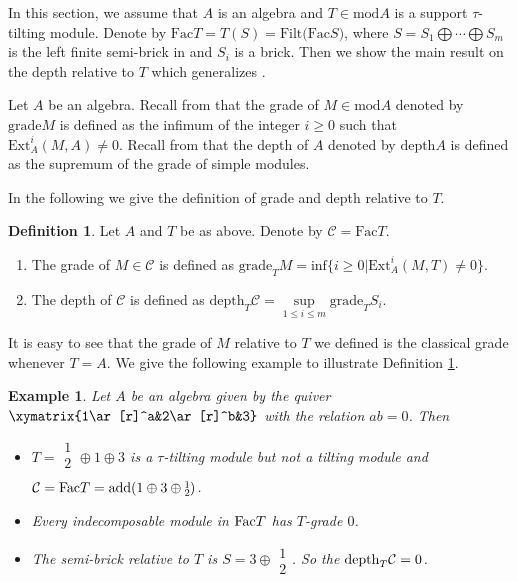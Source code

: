 \documentclass[a4paper]{amsart}
\newtheorem{exm}[thm]{Example}
\theoremstyle{definition}
\newtheorem{defn}[thm]{Definition}
\theoremstyle{remark}
\numberwithin{equation}{section}
\begin{document}
In this section, we assume that $A$ is an algebra and $T\in \text{mod} A$ is a support $\tau$-tilting module. Denote by $\text{Fac}T=T(S)=\text{Filt(Fac} S)$, where $S=S_1\bigoplus \cdots \bigoplus S_m$ is the left finite semi-brick in \cite[Theorem 2.3(2)]{As}
 and $S_i$ is a brick. Then we show the main result on the depth relative to $T$ which generalizes \cite[Proposition 1.3]{G}.


Let $A$ be an algebra. Recall from \cite{AuB} that the grade of $M\in \text{mod}A$ denoted by $\text{grade}M$ is defined as the infimum of the integer $i\geq 0$ such that $\text{Ext}^i_A(M,A)\neq 0$. Recall from \cite{G} that the depth of $A$ denoted by $\text{depth}A$ is defined as the supremum of the grade of simple modules.

In the following we give the definition of grade and depth relative to $T$.

\begin{defn}\label{3.1} Let $A$ and $T$ be as above. Denote by $\mathcal{C}=\text{Fac}T$.
\begin{enumerate}
\item The grade of $M\in \mathcal{C}$ is defined as
$\text{grade}_T M =\text{inf}\{i\geq 0 |\text{Ext}^i_A(M,T)\neq 0\}.$
\item The depth of $\mathcal{C}$ is defined as $\text{depth}_T \mathcal{C}={\sup\limits_{1\leq i\leq m}} \text{grade}_T S_i$.
\end{enumerate}
\end{defn}
 It is easy to see that the grade of $M$ relative to $T$ we defined is the classical grade whenever $T=A$.
We give the following example to illustrate Definition \ref{3.1}.

\begin{exm}\label{3.2} Let $A$ be an algebra given by the quiver $\xymatrix{1\ar[r]^a&2\ar[r]^b&3}$ with the relation $ab=0$. Then
\begin{itemize}
    \item
    [(1)] $T=\substack{ 1\\2\\ }\oplus1\oplus3$ is a $\tau$-tilting module but not a tilting module and $\mathcal{C}=\textup{Fac} T=\textup{add}(1\oplus3\oplus\substack{1\\2})$.
    \item
    [(2)] Every indecomposable module in $\textup{Fac}T$ has $T$-grade $0$.
    \item
    [(3)] The semi-brick relative to $T$ is $S=3\oplus\substack{1\\2}$. So the $\textup{depth}_T \mathcal{C}=0$.
\end{itemize}
\end{exm}
\end{document}
